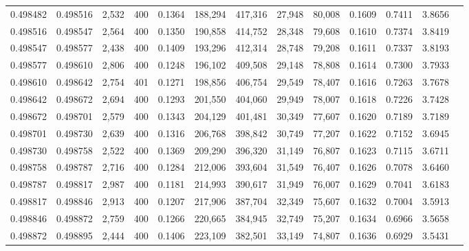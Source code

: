 \begin{tabular}{rrrrrrrrrrrrr}
0.498482 & 0.498516 & 2,532 & 400 &                                     0.1364 & 188,294 & 417,316 &  27,948 &  80,008 & 0.1609 & 0.7411 & 3.8656 \\
0.498516 & 0.498547 & 2,564 & 400 &                                     0.1350 & 190,858 & 414,752 &  28,348 &  79,608 & 0.1610 & 0.7374 & 3.8419 \\
0.498547 & 0.498577 & 2,438 & 400 &                                     0.1409 & 193,296 & 412,314 &  28,748 &  79,208 & 0.1611 & 0.7337 & 3.8193 \\
0.498577 & 0.498610 & 2,806 & 400 &                                     0.1248 & 196,102 & 409,508 &  29,148 &  78,808 & 0.1614 & 0.7300 & 3.7933 \\
0.498610 & 0.498642 & 2,754 & 401 &                                     0.1271 & 198,856 & 406,754 &  29,549 &  78,407 & 0.1616 & 0.7263 & 3.7678 \\
0.498642 & 0.498672 & 2,694 & 400 &                                     0.1293 & 201,550 & 404,060 &  29,949 &  78,007 & 0.1618 & 0.7226 & 3.7428 \\
0.498672 & 0.498701 & 2,579 & 400 &                                     0.1343 & 204,129 & 401,481 &  30,349 &  77,607 & 0.1620 & 0.7189 & 3.7189 \\
0.498701 & 0.498730 & 2,639 & 400 &                                     0.1316 & 206,768 & 398,842 &  30,749 &  77,207 & 0.1622 & 0.7152 & 3.6945 \\
0.498730 & 0.498758 & 2,522 & 400 &                                     0.1369 & 209,290 & 396,320 &  31,149 &  76,807 & 0.1623 & 0.7115 & 3.6711 \\
0.498758 & 0.498787 & 2,716 & 400 &                                     0.1284 & 212,006 & 393,604 &  31,549 &  76,407 & 0.1626 & 0.7078 & 3.6460 \\
0.498787 & 0.498817 & 2,987 & 400 &                                     0.1181 & 214,993 & 390,617 &  31,949 &  76,007 & 0.1629 & 0.7041 & 3.6183 \\
0.498817 & 0.498846 & 2,913 & 400 &                                     0.1207 & 217,906 & 387,704 &  32,349 &  75,607 & 0.1632 & 0.7004 & 3.5913 \\
0.498846 & 0.498872 & 2,759 & 400 &                                     0.1266 & 220,665 & 384,945 &  32,749 &  75,207 & 0.1634 & 0.6966 & 3.5658 \\
0.498872 & 0.498895 & 2,444 & 400 &                                     0.1406 & 223,109 & 382,501 &  33,149 &  74,807 & 0.1636 & 0.6929 & 3.5431 \\

\end{tabular}
